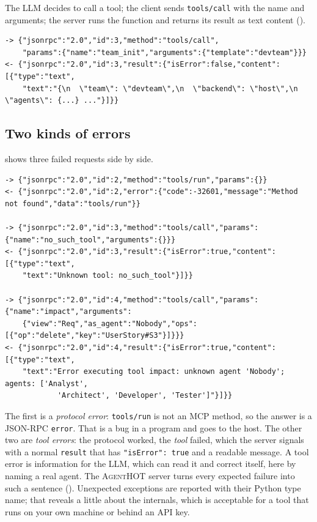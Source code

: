 \documentclass[10pt,a4paper]{article}
\newcommand{\tool}{\textsc{AgentHOT}}
\newcommand{\code}[1]{\texttt{#1}}
\newcommand{\what}[1]{\par\smallskip\noindent{\sffamily\bfseries\color{accent}#1}\quad}
\begin{document}
\what{4. Call.} The LLM decides to call a tool; the client sends
\code{tools/call} with the name and arguments; the server runs the function
and returns its result as text content ().

\begin{lstlisting}[style=wire, caption={Observed: a successful call (JSON text inside \code{content} abridged).}, label={lst:call}]
-> {"jsonrpc":"2.0","id":3,"method":"tools/call",
    "params":{"name":"team_init","arguments":{"template":"devteam"}}}
<- {"jsonrpc":"2.0","id":3,"result":{"isError":false,"content":[{"type":"text",
    "text":"{\n  \"team\": \"devteam\",\n  \"backend\": \"host\",\n  \"agents\": {...} ..."}]}}
\end{lstlisting}

\subsection{Two kinds of errors}

 shows three failed requests side by side.

\begin{lstlisting}[style=wire, caption={Observed: a protocol error and two tool errors.}, label={lst:errors}]
-> {"jsonrpc":"2.0","id":2,"method":"tools/run","params":{}}
<- {"jsonrpc":"2.0","id":2,"error":{"code":-32601,"message":"Method not found","data":"tools/run"}}

-> {"jsonrpc":"2.0","id":3,"method":"tools/call","params":{"name":"no_such_tool","arguments":{}}}
<- {"jsonrpc":"2.0","id":3,"result":{"isError":true,"content":[{"type":"text",
    "text":"Unknown tool: no_such_tool"}]}}

-> {"jsonrpc":"2.0","id":4,"method":"tools/call","params":{"name":"impact","arguments":
    {"view":"Req","as_agent":"Nobody","ops":[{"op":"delete","key":"UserStory#S3"}]}}}
<- {"jsonrpc":"2.0","id":4,"result":{"isError":true,"content":[{"type":"text",
    "text":"Error executing tool impact: unknown agent 'Nobody'; agents: ['Analyst',
            'Architect', 'Developer', 'Tester']"}]}}
\end{lstlisting}

The first is a \emph{protocol error}: \code{tools/run} is not an MCP method,
so the answer is a JSON-RPC \code{error}. That is a bug in a program and goes
to the host. The other two are \emph{tool errors}: the protocol worked, the
\emph{tool} failed, which the server signals with a normal \code{result} that
has \code{"isError": true} and a readable message. A tool error is
information for the LLM, which can read it and correct itself, here by
naming a real agent. The \tool{} server turns every expected failure into
such a sentence (). Unexpected exceptions are reported
with their Python type name; that reveals a little about the internals,
which is acceptable for a tool that runs on your own machine or behind an
API key.
\end{document}
